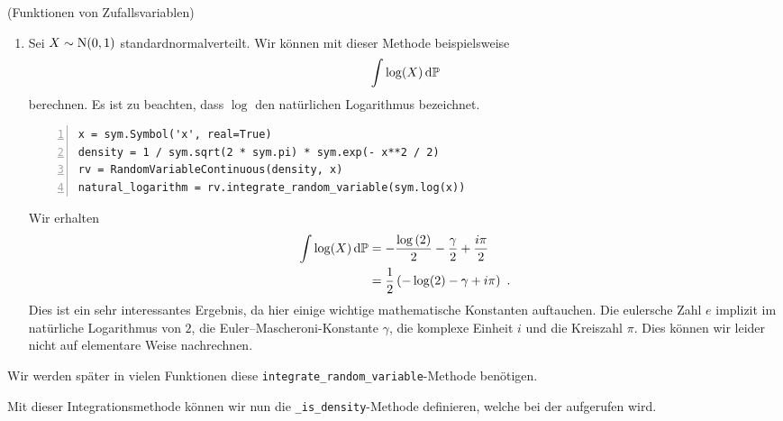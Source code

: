 \begin{Beispiel}{(Funktionen von Zufallsvariablen)}
\begin{enumerate}[label=(\roman*)]
\item Sei $X \sim \operatorname{N}(0, 1)$ standardnormalverteilt. Wir können mit dieser Methode beispielsweise
\[\int \log(X) \mathop{}\!\mathrm{d} \mathbb{P}\]
berechnen. Es ist zu beachten, dass $\log$ den natürlichen Logarithmus bezeichnet.
\begin{lstlisting}[numbers=left, numberstyle=\tiny\color{codegray}]
x = sym.Symbol('x', real=True)
density = 1 / sym.sqrt(2 * sym.pi) * sym.exp(- x**2 / 2)
rv = RandomVariableContinuous(density, x)
natural_logarithm = rv.integrate_random_variable(sym.log(x))
\end{lstlisting}
Wir erhalten
\begin{align*}
\int \log(X) \mathop{}\!\mathrm{d} \mathbb{P} &= - \frac{\log{\left(2 \right)}}{2} - \frac{\gamma}{2} + \frac{i \pi}{2}\\
&= \frac{1}{2} \left( - \log(2) - \gamma + i \pi \right)~.
\end{align*}
Dies ist ein sehr interessantes Ergebnis, da hier einige wichtige mathematische Konstanten auftauchen. Die eulersche Zahl $e$ implizit im natürliche Logarithmus von $2$, die Euler–Mascheroni-Konstante $\gamma$, die komplexe Einheit $i$ und die Kreiszahl $\pi$. Dies können wir leider nicht auf elementare Weise nachrechnen.
\end{enumerate}
Wir werden später in vielen Funktionen diese \lstinline|integrate_random_variable|-Methode benötigen.
\end{Beispiel}

\newpage

Mit dieser Integrationsmethode können wir nun die \lstinline|_is_density|-Methode definieren, welche bei der \hyperlink{Code:Initialisierung}{} aufgerufen wird.

